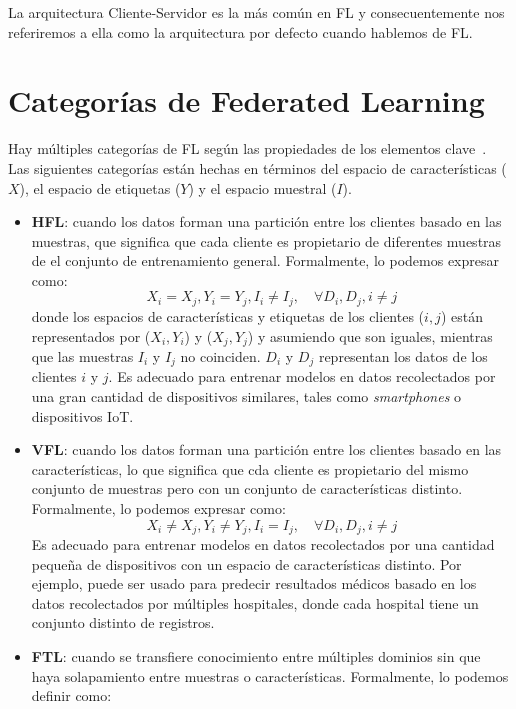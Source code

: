 La arquitectura Cliente-Servidor es la más común en \ac{FL} y consecuentemente nos referiremos a ella como la arquitectura por defecto cuando hablemos de \ac{FL}.

\section{Categorías de Federated Learning}
Hay múltiples categorías de \ac{FL} según las propiedades de los elementos clave~\cite{survey-nuria-2023}. Las siguientes categorías están hechas en términos del espacio de características ($X$), el espacio de etiquetas ($Y$) y el espacio muestral ($I$).
\begin{itemize}
    \item \textbf{\ac{HFL}}: cuando los datos forman una partición entre los clientes basado en las muestras, que significa que cada cliente es propietario de diferentes muestras de el conjunto de entrenamiento general. Formalmente, lo podemos expresar como:
    \begin{equation}
        X_i = X_j, Y_i = Y_j, I_i \ne I_j, \quad \forall D_i, D_j, i \ne j
    \end{equation}
    donde los espacios de características y etiquetas de los clientes ($i, j$) están representados por ($X_i, Y_i$) y ($X_j, Y_j$) y asumiendo que son iguales, mientras que las muestras $I_i$ y $I_j$ no coinciden. $D_i$ y $D_j$ representan los datos de los clientes $i$ y $j$. Es adecuado para entrenar modelos en datos recolectados por una gran cantidad de dispositivos similares, tales como \textit{smartphones} o dispositivos \ac{IoT}.
    \item \textbf{\ac{VFL}}: cuando los datos forman una partición entre los clientes basado en las características, lo que significa que cda cliente es propietario del mismo conjunto de muestras pero con un conjunto de características distinto. Formalmente, lo podemos expresar como:
    \begin{equation}
        X_i \ne X_j, Y_i \ne Y_j, I_i = I_j, \quad \forall D_i, D_j, i \ne j
    \end{equation}
    Es adecuado para entrenar modelos en datos recolectados por una cantidad pequeña de dispositivos con un espacio de características distinto. Por ejemplo, puede ser usado para predecir resultados médicos basado en los datos recolectados por múltiples hospitales, donde cada hospital tiene un conjunto distinto de registros.
    \item \textbf{\ac{FTL}}: cuando se transfiere conocimiento entre múltiples dominios sin que haya solapamiento entre muestras o características. Formalmente, lo podemos definir como: 

\end{itemize}
